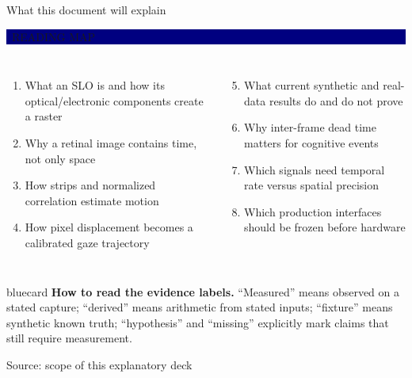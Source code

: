 \documentclass[aspectratio=169,9pt,xcolor=table]{beamer}
\newcommand{\evidence}[2]{%
  \vspace{-0.06cm}\hfill
  \colorbox{#2}{\color{white}\bfseries\scriptsize\strut\ #1\ }\par
  \vspace{0.04cm}
}
\newcommand{\source}[1]{\vfill{\color{Mid}\tiny Source: #1}}
\begin{document}
\begin{frame}{What this document will explain}
  \evidence{READING MAP}{Navy}
  \begin{columns}[T,onlytextwidth]
      \begin{enumerate}
        \item What an SLO is and how its optical/electronic components create a raster
        \item Why a retinal image contains time, not only space
        \item How strips and normalized correlation estimate motion
        \item How pixel displacement becomes a calibrated gaze trajectory
      \end{enumerate}
      \begin{enumerate}\setcounter{enumi}{4}
        \item What current synthetic and real-data results do and do not prove
        \item Why inter-frame dead time matters for cognitive events
        \item Which signals need temporal rate versus spatial precision
        \item Which production interfaces should be frozen before hardware
      \end{enumerate}
  \end{columns}
  \vspace{0.35cm}
  \begin{beamercolorbox}[rounded=true,sep=.14cm]{bluecard}
    \textbf{How to read the evidence labels.} ``Measured'' means observed on a stated capture;
    ``derived'' means arithmetic from stated inputs; ``fixture'' means synthetic known truth;
    ``hypothesis'' and ``missing'' explicitly mark claims that still require measurement.
  \end{beamercolorbox}
  \source{scope of this explanatory deck}
\end{frame}
\end{document}
